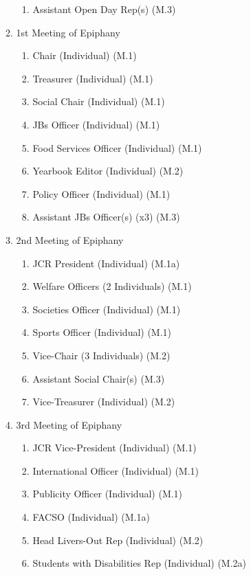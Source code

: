 \begin{enumerate}
\begin{enumerate}
\begin{enumerate}
            \item Assistant Open Day Rep(s) (M.3)
        \end{enumerate}
        \item 1st Meeting of Epiphany
        \begin{enumerate}
            \item Chair (Individual) (M.1)
            \item Treasurer (Individual) (M.1)
            \item Social Chair (Individual) (M.1)
            \item JBs Officer (Individual) (M.1)
            \item Food Services Officer (Individual) (M.1)
            \item Yearbook Editor (Individual) (M.2)
            \item Policy Officer (Individual) (M.1)
            \item Assistant JBs Officer(s) (x3) (M.3)
        \end{enumerate}
        \item 2nd Meeting of Epiphany
        \begin{enumerate}
            \item JCR President (Individual) (M.1a)
            \item Welfare Officers (2 Individuals)  (M.1)
            \item Societies Officer (Individual) (M.1)
            \item Sports Officer (Individual) (M.1)
            \item Vice-Chair (3 Individuals) (M.2)
            \item Assistant Social Chair(s) (M.3)
            \item Vice-Treasurer (Individual) (M.2)
        \end{enumerate}
        \item 3rd Meeting of Epiphany
        \begin{enumerate}
            \item JCR Vice-President (Individual) (M.1)
            \item International Officer (Individual) (M.1)
            \item Publicity Officer (Individual) (M.1)
            \item FACSO (Individual) (M.1a)
            \item Head Livers-Out Rep (Individual) (M.2)
            \item Students with Disabilities Rep (Individual) (M.2a)

\end{enumerate}
\end{enumerate}
\end{enumerate}
